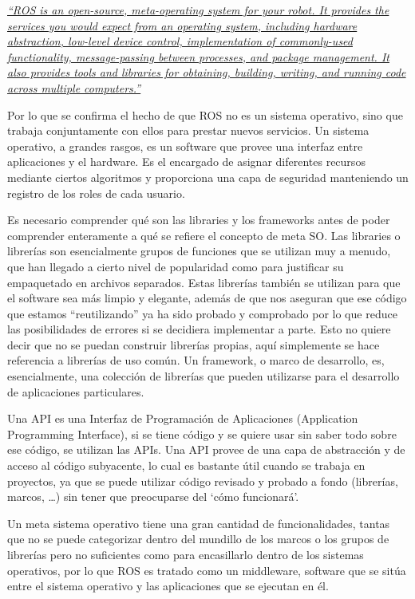 \href{http://wiki.ros.org/ROS/Introduction}{\textit{``ROS is an open-source, meta-operating system for your robot. It provides the services you would expect from an operating system, including hardware abstraction, low-level device control, implementation of commonly-used functionality, message-passing between processes, and package management. It also provides tools and libraries for obtaining, building, writing, and running code across multiple computers.''}}

Por lo que se confirma el hecho de que ROS no es un sistema operativo, sino que trabaja conjuntamente con ellos para prestar nuevos servicios. 
Un sistema operativo, a grandes rasgos, es un software que provee una interfaz entre aplicaciones y el hardware. Es el encargado de asignar diferentes recursos mediante ciertos algoritmos y proporciona una capa de seguridad manteniendo un registro de los roles de cada usuario.

Es necesario comprender qué son las libraries y los frameworks antes de poder comprender enteramente a qué se refiere el concepto de meta SO. Las libraries o librerías son esencialmente grupos de funciones que se utilizan muy a menudo, que han llegado a cierto nivel de popularidad como para justificar su empaquetado en archivos separados. Estas librerías también se utilizan para que el software sea más limpio y elegante, además de que nos aseguran que ese código que estamos ``reutilizando'' ya ha sido probado y comprobado por lo que reduce las posibilidades de errores si se decidiera implementar a parte. Esto no quiere decir que no se puedan construir librerías propias, aquí simplemente se hace referencia a librerías de uso común. Un framework, o marco de desarrollo, es, esencialmente, una colección de librerías que pueden utilizarse para el desarrollo de aplicaciones particulares.

Una API es una Interfaz de Programación de Aplicaciones (Application Programming Interface), si se tiene código y se quiere usar sin saber todo sobre ese código, se utilizan las APIs. Una API provee de una capa de abstracción y de acceso al código subyacente, lo cual es bastante útil cuando se trabaja en proyectos, ya que se puede utilizar código revisado y probado a fondo (librerías, marcos, …) sin tener que preocuparse del ‘cómo funcionará’.

Un meta sistema operativo tiene una gran cantidad de funcionalidades, tantas que no se puede categorizar dentro del mundillo de los marcos o los grupos de librerías pero no suficientes como para encasillarlo dentro de los sistemas operativos, por lo que ROS es tratado como un middleware, software que se sitúa entre el sistema operativo y las aplicaciones que se ejecutan en él.

